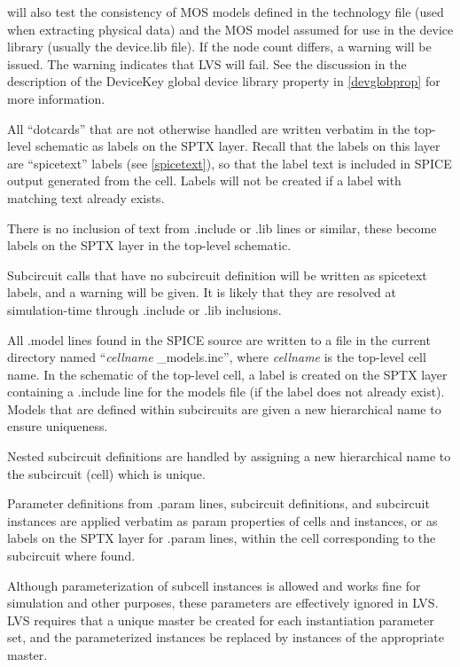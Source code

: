 {\Xic} will also test the consistency of MOS models defined in the
technology file (used when extracting physical data) and the MOS model
assumed for use in the device library (usually the {\vt device.lib}
file).  If the node count differs, a warning will be issued.  The
warning indicates that LVS will fail.  See the discussion in the
description of the {\et DeviceKey} global device library property in
\ref{devglobprop} for more information.

All ``dotcards'' that are not otherwise handled are written verbatim
in the top-level schematic as labels on the SPTX layer.  Recall that
the labels on this layer are ``spicetext'' labels (see
\ref{spicetext}), so that the label text is included in SPICE output
generated from the cell.  Labels will not be created if a label with
matching text already exists.

There is no inclusion of text from {\vt .include} or {\vt .lib} lines
or similar, these become labels on the SPTX layer in the top-level
schematic.

Subcircuit calls that have no subcircuit definition will be written as
spicetext labels, and a warning will be given.  It is likely that they
are resolved at simulation-time through {\vt .include} or {\vt .lib}
inclusions.

All {\vt .model} lines found in the SPICE source are written to a
file in the current directory named ``{\it cellname\/}{\vt
\_models.inc}'', where {\it cellname} is the top-level cell name.  In
the schematic of the top-level cell, a label is created on the SPTX
layer containing a {\vt .include} line for the models file (if the
label does not already exist).  Models that are defined within
subcircuits are given a new hierarchical name to ensure uniqueness.

Nested subcircuit definitions are handled by assigning a new
hierarchical name to the subcircuit (cell) which is unique.

Parameter definitions from {\vt .param} lines, subcircuit
definitions, and subcircuit instances are applied verbatim as {\et
param} properties of cells and instances, or as labels on the SPTX
layer for {\vt .param} lines, within the cell corresponding to the
subcircuit where found.

Although parameterization of subcell instances is allowed and works
fine for simulation and other purposes, these parameters are
effectively ignored in LVS.  LVS requires that a unique master be
created for each instantiation parameter set, and the parameterized
instances be replaced by instances of the appropriate master.

